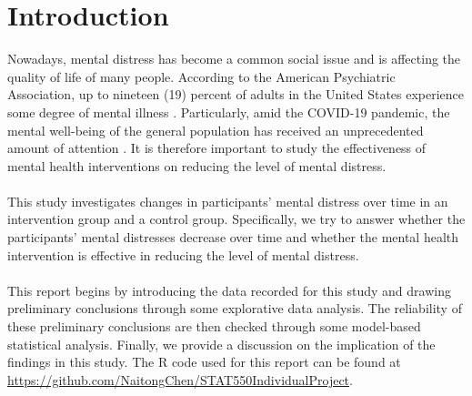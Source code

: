 

\section{Introduction}\label{sec:introduction}
Nowadays, mental distress has become a common social issue and is affecting the quality of life of many people. According to the American Psychiatric Association, up to nineteen (19) percent of adults in the United States experience some degree of mental illness \cite{apastat}. Particularly, amid the COVID-19 pandemic, the mental well-being of the general population has received an unprecedented amount of attention \cite{twenge2020mental}. It is therefore important to study the effectiveness of mental health interventions on reducing the level of mental distress.\\\\
This study investigates changes in participants' mental distress over time in an intervention group and a control group. Specifically, we try to answer whether the participants' mental distresses decrease over time and whether the mental health intervention is effective in reducing the level of mental distress.\\\\
This report begins by introducing the data recorded for this study and drawing preliminary conclusions through some explorative data analysis. The reliability of these preliminary conclusions are then checked through some model-based statistical analysis. Finally, we provide a discussion on the implication of the findings in this study. The R code used for this report can be found at \url{https://github.com/NaitongChen/STAT550IndividualProject}.
